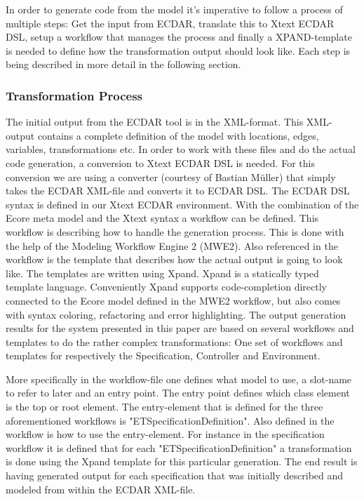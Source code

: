 In order to generate code from the model it's imperative to follow a process of
multiple steps: Get the input from ECDAR, translate this to Xtext ECDAR DSL,
setup a workflow that manages the process and finally a XPAND-template is needed
to define how the transformation output should look like. Each step is being
described in more detail in the following section.

\subsubsection{Transformation Process}
\label{transformation-process}

The initial output from the ECDAR tool is in the XML-format. This XML-output
contains a complete definition of the model with locations, edges, variables,
transformations etc. In order to work with these files and do the actual code
generation, a conversion to Xtext ECDAR DSL is needed. For this conversion we
are using a converter (courtesy of Bastian M\"uller) that simply takes the ECDAR XML-file
and converts it to ECDAR DSL. The ECDAR DSL syntax is defined in our Xtext ECDAR
environment. With the combination of the Ecore meta model and the Xtext syntax a
workflow can be defined. This workflow is describing how to handle the
generation process. This is done with the help of the Modeling Workflow Engine 2
(MWE2). Also referenced in the workflow is the template that describes how the
actual output is going to look like. The templates are written using
Xpand. Xpand is a statically typed template language. Conveniently Xpand
supports code-completion directly connected to the Ecore model defined in the
MWE2 workflow, but also comes with syntax coloring, refactoring and error
highlighting. The output generation results for the system presented in this
paper are based on several workflows and templates to do the rather complex
transformations: One set of workflows and templates for respectively the
Specification, Controller and Environment.

More specifically in the workflow-file one defines what model to use, a
slot-name to refer to later and an entry point. The entry point defines which
class element is the top or root element. The entry-element that is defined for
the three aforementioned workflows is "ETSpecificationDefinition". Also defined
in the workflow is how to use the entry-element. For instance in the
specification workflow it is defined that for each "ETSpecificationDefinition" a
transformation is done using the Xpand template for this particular
generation. The end result is having generated output for each specification that
was initially described and modeled from within the ECDAR XML-file.

